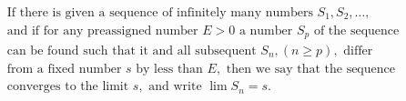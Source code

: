 \documentclass[preview]{standalone}
\begin{document}
\begin{align*}
\text{If there is given a sequence of infinitely many numbers } S_1, S_2, \ldots, \\ \text{and if for any preassigned number } E > 0 \text{ a number } S_p \text{ of the sequence} \\ \text{can be found such that it and all subsequent } S_n, (n \geq p), \text{ differ} \\ \text{from a fixed number } s \text{ by less than } E, \text{ then we say that the sequence} \\ \text{converges to the limit } s, \text{ and write } \lim S_n = s.
\end{align*}
\end{document}
